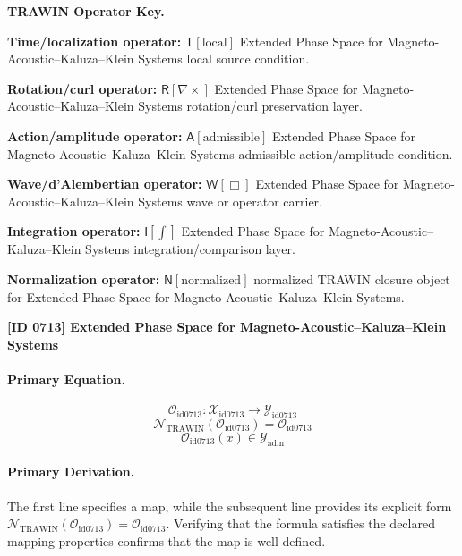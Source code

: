\par\vspace{0.45\baselineskip}
\noindent\begin{minipage}[t]{\linewidth}
\begingroup
\small
\raggedright
\textbf{TRAWIN Operator Key.}\par
\noindent\textbf{Time/localization operator:} $\mathsf{T}\!\left[\mathrm{local}\right]$ Extended Phase Space for Magneto-Acoustic--Kaluza--Klein Systems local source condition.\par
\noindent\textbf{Rotation/curl operator:} $\mathsf{R}\!\left[\nabla\times\right]$ Extended Phase Space for Magneto-Acoustic--Kaluza--Klein Systems rotation/curl preservation layer.\par
\noindent\textbf{Action/amplitude operator:} $\mathsf{A}\!\left[\mathrm{admissible}\right]$ Extended Phase Space for Magneto-Acoustic--Kaluza--Klein Systems admissible action/amplitude condition.\par
\noindent\textbf{Wave/d'Alembertian operator:} $\mathsf{W}\!\left[\Box\right]$ Extended Phase Space for Magneto-Acoustic--Kaluza--Klein Systems wave or operator carrier.\par
\noindent\textbf{Integration operator:} $\mathsf{I}\!\left[\int\right]$ Extended Phase Space for Magneto-Acoustic--Kaluza--Klein Systems integration/comparison layer.\par
\noindent\textbf{Normalization operator:} $\mathsf{N}\!\left[\mathrm{normalized}\right]$ normalized TRAWIN closure object for Extended Phase Space for Magneto-Acoustic--Kaluza--Klein Systems.\par
\endgroup
\end{minipage}

\clearpage
\noindent\textbf{[ID 0713] Extended Phase Space for Magneto-Acoustic--Kaluza--Klein Systems}\par
\vspace{0.35em}
\paragraph{Primary Equation.}
\[
\mathcal{O}_{\mathrm{id0713}}:\mathcal{X}_{\mathrm{id0713}}\longrightarrow\mathcal{Y}_{\mathrm{id0713}}
\]
\[
\mathcal{N}_{\mathrm{TRAWIN}}(\mathcal{O}_{\mathrm{id0713}})=\mathcal{O}_{\mathrm{id0713}}
\]
\[
\mathcal{O}_{\mathrm{id0713}}(x)\in\mathcal{Y}_{\mathrm{adm}}
\]

\paragraph{Primary Derivation.}
The first line specifies a map, while the subsequent line provides its explicit form \( \mathcal{N}_{\mathrm{TRAWIN}}(\mathcal{O}_{\mathrm{id0713}})=\mathcal{O}_{\mathrm{id0713}} \). Verifying that the formula satisfies the declared mapping properties confirms that the map is well defined.
